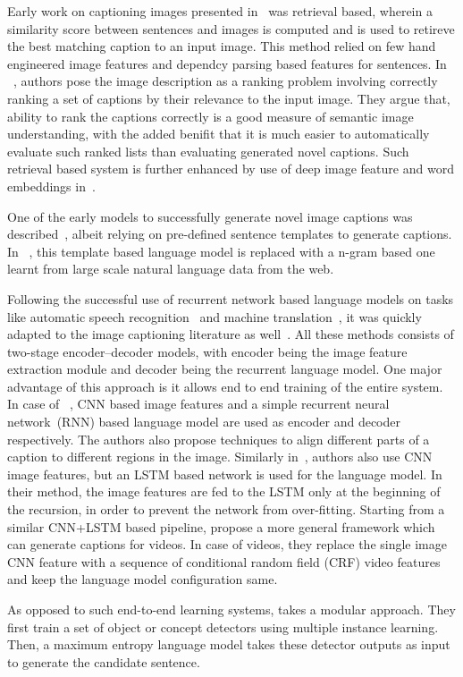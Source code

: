 Early work on captioning images presented in~\cite{Farhadi2010} was retrieval
based, wherein a similarity score between sentences and images is computed and
is used to retireve the best matching caption to an input image. 
This method relied on few hand engineered image features and dependcy parsing
based features for sentences.
In ~\cite{Hodosh2013}, authors pose the image description as a ranking problem
involving correctly ranking a set of captions by their relevance to the input
image.
They argue that, ability to rank the captions correctly is a good measure of
semantic image understanding, with the added benifit that it is much easier to
automatically evaluate such ranked lists than evaluating generated novel
captions.
Such retrieval based system is further enhanced by use of deep image feature and
word embeddings in~\cite{Karpathy2014}.

One of the early models to successfully generate novel image captions was
described~\cite{kulkarni2013babytalk}, albeit relying on pre-defined sentence
templates to generate captions.
In ~\cite{Li2011}, this template based language model is replaced with a n-gram
based one learnt from large scale natural language data from the web.

Following the successful use of recurrent network based language models on
tasks like automatic speech recognition~\cite{mikolov2010recurrent} and machine
translation~\cite{bahdanau2014neural}, it was quickly adapted to the image
captioning literature as well~\cite{Karpathy_2015_CVPR, Vinyals_2015_CVPR,
donahue2015long}.
All these methods consists of two-stage encoder--decoder models, with 
encoder being the image feature extraction module and decoder being the
recurrent language model.
One major advantage of this approach is it allows end to end training of the
entire system.
In case of ~\cite{Karpathy_2015_CVPR}, CNN based image features and a simple
recurrent neural network~(RNN) based language model are used as encoder and
decoder respectively.
The authors also propose techniques to align different parts of a caption to
different regions in the image. 
Similarly in~\cite{Vinyals_2015_CVPR}, authors also use CNN image features, but
an LSTM based network is used for the language model.
In their method, the image features are fed to the LSTM only at the beginning of
the recursion, in order to prevent the network from over-fitting.
Starting from a similar CNN+LSTM based pipeline,\cite{donahue2015long} propose a
more general framework which can generate captions for videos.
In case of videos, they replace the single image CNN feature with a sequence of
conditional random field (CRF) video features and keep the language model
configuration same.

As opposed to such end-to-end learning systems, \cite{Fang2015} takes a modular
approach. 
They first train a set of object or concept detectors using multiple instance
learning. 
Then, a maximum entropy language model takes these detector outputs as input to
generate the candidate sentence.
